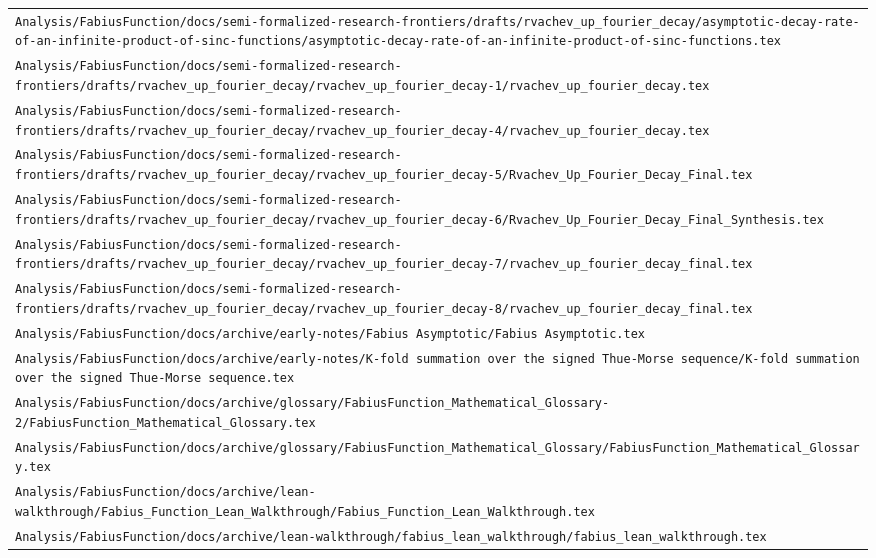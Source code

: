 \begin{longtable}{@{}p{\textwidth}@{}}
\nolinkurl{Analysis/FabiusFunction/docs/semi-formalized-research-frontiers/drafts/rvachev_up_fourier_decay/asymptotic-decay-rate-of-an-infinite-product-of-sinc-functions/asymptotic-decay-rate-of-an-infinite-product-of-sinc-functions.tex}\\[0.12em]
\nolinkurl{Analysis/FabiusFunction/docs/semi-formalized-research-frontiers/drafts/rvachev_up_fourier_decay/rvachev_up_fourier_decay-1/rvachev_up_fourier_decay.tex}\\[0.12em]
\nolinkurl{Analysis/FabiusFunction/docs/semi-formalized-research-frontiers/drafts/rvachev_up_fourier_decay/rvachev_up_fourier_decay-4/rvachev_up_fourier_decay.tex}\\[0.12em]
\nolinkurl{Analysis/FabiusFunction/docs/semi-formalized-research-frontiers/drafts/rvachev_up_fourier_decay/rvachev_up_fourier_decay-5/Rvachev_Up_Fourier_Decay_Final.tex}\\[0.12em]
\nolinkurl{Analysis/FabiusFunction/docs/semi-formalized-research-frontiers/drafts/rvachev_up_fourier_decay/rvachev_up_fourier_decay-6/Rvachev_Up_Fourier_Decay_Final_Synthesis.tex}\\[0.12em]
\nolinkurl{Analysis/FabiusFunction/docs/semi-formalized-research-frontiers/drafts/rvachev_up_fourier_decay/rvachev_up_fourier_decay-7/rvachev_up_fourier_decay_final.tex}\\[0.12em]
\nolinkurl{Analysis/FabiusFunction/docs/semi-formalized-research-frontiers/drafts/rvachev_up_fourier_decay/rvachev_up_fourier_decay-8/rvachev_up_fourier_decay_final.tex}\\[0.12em]
\nolinkurl{Analysis/FabiusFunction/docs/archive/early-notes/Fabius Asymptotic/Fabius Asymptotic.tex}\\[0.12em]
\nolinkurl{Analysis/FabiusFunction/docs/archive/early-notes/K-fold summation over the signed Thue-Morse sequence/K-fold summation over the signed Thue-Morse sequence.tex}\\[0.12em]
\nolinkurl{Analysis/FabiusFunction/docs/archive/glossary/FabiusFunction_Mathematical_Glossary-2/FabiusFunction_Mathematical_Glossary.tex}\\[0.12em]
\nolinkurl{Analysis/FabiusFunction/docs/archive/glossary/FabiusFunction_Mathematical_Glossary/FabiusFunction_Mathematical_Glossary.tex}\\[0.12em]
\nolinkurl{Analysis/FabiusFunction/docs/archive/lean-walkthrough/Fabius_Function_Lean_Walkthrough/Fabius_Function_Lean_Walkthrough.tex}\\[0.12em]
\nolinkurl{Analysis/FabiusFunction/docs/archive/lean-walkthrough/fabius_lean_walkthrough/fabius_lean_walkthrough.tex}\\[0.12em]

\end{longtable}
